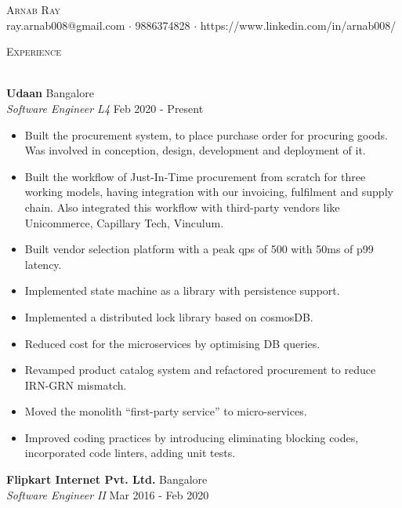 \documentclass[a4paper]{article}
\newcommand{\lineunder} {
    \vspace*{-8pt} \\
    \hspace*{-18pt} \hrulefill \\
}
\newcommand{\header} [1] {
    {\hspace*{-18pt}\vspace*{6pt} \textsc{#1}}
    \vspace*{-6pt} \lineunder
}
\begin{document}
\vspace*{-40pt}

    

\vspace*{-10pt}
\begin{center}
	{\Huge \scshape {Arnab Ray}}\\
	ray.arnab008@gmail.com $\cdot$ 9886374828 $\cdot$ https://www.linkedin.com/in/arnab008/\\
\end{center}

\header{Experience}
\vspace{1mm}

\textbf{Udaan} \hfill Bangalore\\
\textit{Software Engineer L4} \hfill Feb 2020 - Present\\
\vspace{-1mm}
\begin{itemize} \itemsep 1pt
	\item Built the procurement system, to place purchase order for procuring goods. Was involved in conception, design, development and deployment of it.
	\item Built the workflow of Just-In-Time procurement from scratch for three working models, having integration with our invoicing, fulfilment and supply chain. Also integrated this workflow with third-party vendors like Unicommerce, Capillary Tech, Vinculum.
	\item Built vendor selection platform with a peak qps of 500 with 50ms of p99 latency.
	\item Implemented state machine as a library with persistence support.
	\item Implemented a distributed lock library based on cosmosDB.
	\item Reduced cost for the microservices by optimising DB queries.
	\item Revamped product catalog system and refactored procurement to reduce IRN-GRN mismatch.
	\item Moved the monolith “first-party service” to micro-services.
	\item Improved coding practices by introducing eliminating blocking codes, incorporated code linters, adding unit tests.
\end{itemize}
\textbf{Flipkart Internet Pvt. Ltd.} \hfill Bangalore\\
\textit{Software Engineer II} \hfill Mar 2016 - Feb 2020\\
\end{document}
